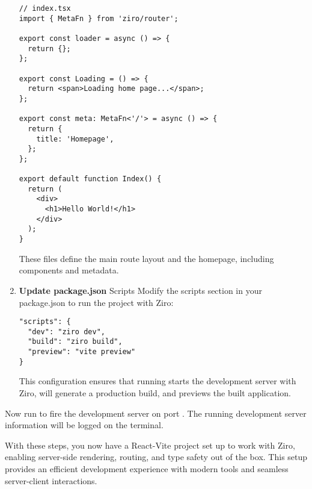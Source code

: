 \begin{enumerate}
  \begin{verbatim}
// index.tsx
import { MetaFn } from 'ziro/router';

export const loader = async () => {
  return {};
};

export const Loading = () => {
  return <span>Loading home page...</span>;
};

export const meta: MetaFn<'/'> = async () => {
  return {
    title: 'Homepage',
  };
};

export default function Index() {
  return (
    <div>
      <h1>Hello World!</h1>
    </div>
  );
}
      \end{verbatim}
      These files define the main route layout and the homepage, including components and metadata.


      \item \textbf{Update package.json} Scripts Modify the scripts section in your package.json to run the project with Ziro:
\begin{verbatim}
"scripts": {
  "dev": "ziro dev",
  "build": "ziro build",
  "preview": "vite preview"
}
\end{verbatim}
This configuration ensures that running  starts the development server with Ziro,  will generate a production build, and  previews the built application.

\end{enumerate}

Now run  to fire the development server on port . The running development server information will be logged on the terminal.

With these steps, you now have a React-Vite project set up to work with Ziro, enabling server-side rendering, routing, and type safety out of the box. This setup provides an efficient development experience with modern tools and seamless server-client interactions.

\pagebreak
